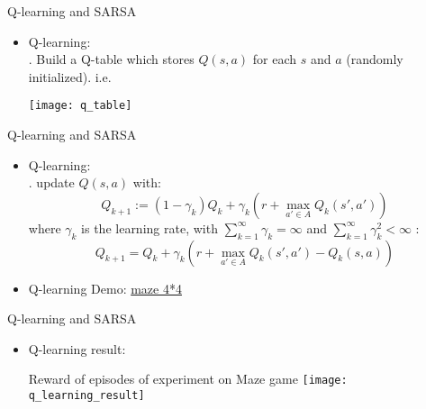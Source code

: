\begin{frame}{Q-learning and SARSA}
    \begin{itemize}
        \item Q-learning:\\
        \bigskip
        \hspace{0.5cm} .  Build a Q-table which stores $Q(s,a)$ for each $s$ and $a$ (randomly initialized). i.e.\\
        \begin{center}\texttt{[image: q\_table]}\end{center}
        
    \end{itemize}
\end{frame}

\begin{frame}{Q-learning and SARSA}
    \begin{itemize}
        \item Q-learning:\\
        \bigskip
        \hspace{0.5cm} . update $Q(s,a)$ with:\\
        \begin{equation}
            Q_{k+1}:=(1-\gamma_{k})Q_{k}+\gamma_{k}(r+\max\limits_{a' \in A}Q_{k}(s',a'))
        \end{equation}
        \hspace{0.7cm} where $\gamma_{k}$ is the learning rate, with $\sum_{k=1}^{\infty}\gamma_{k}=\infty$ and $\sum_{k=1}^{\infty}\gamma^2_{k}<\infty $ :\\
        \begin{equation}
            Q_{k+1}=Q_{k}+\gamma_{k}(r+\max\limits_{a' \in A}Q_{k}(s',a')-Q_{k}(s,a))
        \end{equation}
        \item Q-learning Demo: \href{https://youtu.be/imKK9bpGlaQ}{maze 4*4} \\
        
    \end{itemize}
\end{frame}

\begin{frame}{Q-learning and SARSA}
    \begin{itemize}
        \item Q-learning result:\\
        \begin{center}Reward of episodes of experiment on Maze game \texttt{[image: q\_learning\_result]}\end{center}

    \end{itemize}
\end{frame}

